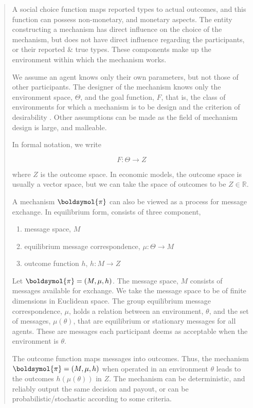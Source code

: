\documentclass[12pt, titlepage, twocolumn]{report}
\begin{document}
\begin{quotation}
A social choice function maps reported types to actual outcomes, and this function can possess non-monetary, and monetary aspects. The entity constructing a mechanism has direct influence on the choice of the mechanism, but does not have direct influence regarding the participants, or their reported \& true types. These components make up the environment within which the mechanism works.

We assume an agent knows only their own parameters, but not those of other participants. The designer of the mechanism knows only the environment space, \(\Theta\), and the goal function, \(F\), that is, the class of environments for which a mechanism is to be design and the criterion of desirability \cite{DEM}. Other assumptions can be made as the field of mechanism design is large, and malleable.

In formal notation, we write

\begin{equation}
	F : \Theta \rightarrow Z
\end{equation}

where \(Z\) is the outcome space. In economic models, the outcome space is usually a vector space, but we can take the space of outcomes to be \(Z \in \mathbb{R}\).

A mechanism \(\boldsymol{\pi}\) can also be viewed as a process for message exchange. In equilibrium form, consists of three component,

\begin{enumerate}
	\item message space, \(M\)
	\item equilibrium message correspondence, \(\mu : \Theta \rightarrow M\)
	\item outcome function \(h\), \(h : M \rightarrow Z\)
\end{enumerate}

Let \(\boldsymol{\pi} = (M, \mu, h)\). The message space, \(M\) consists of messages available for exchange. We take the message space to be of finite dimensions in Euclidean space. The group equilibrium message correspondence, \(\mu\), holds a relation between an environment, \(\theta\), and the set of messages, \(\mu(\theta)\), that are equilibrium or stationary messages for all agents. These are messages each participant deems as acceptable when the environment is \(\theta\).

The outcome function maps messages into outcomes. Thus, the mechanism \(\boldsymol{\pi} = (M, \mu, h)\) when operated in an environment \(\theta\) leads to the outcomes \(h(\mu(\theta))\) in \(Z\). The mechanism can be deterministic, and reliably output the same decision and payout, or can be probabilistic/stochastic according to some criteria.



\end{quotation}
\end{document}
